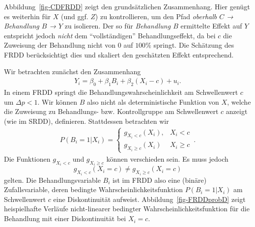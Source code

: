 \documentclass[
  a4paper,
  DIV=11,
  oneside]{scrreprt}
\begin{document}
Abbildung~\ref{fig-CDFRDD} zeigt den grundsätzlichen Zusammenhang. Hier
genügt es weiterhin für \(X\) (und ggf. \(Z\)) zu kontrollieren, um den
Pfad \emph{oberhalb \(C\) → Behandlung \(B\) → \(Y\)} zu isolieren. Der
so für \emph{Behandlung \(B\)} ermittelte Effekt auf \(Y\) entspricht
jedoch \emph{nicht} dem ``vollständigen'' Behandlungseffekt, da bei
\(c\) die Zuweisung der Behandlung nicht von \(0\) auf \(100\%\)
springt. Die Schätzung des FRDD berücksichtigt dies und skaliert den
geschätzten Effekt entsprechend.

Wir betrachten zunächst den Zusammenhang \begin{align}
  Y_i = \beta_0 + \beta_1 B_i + \beta_2 (X_i - c) + u_i.\label{eq-simpleFRDD}
\end{align} In einem FRDD springt die Behandlungswahrscheinlichkeit am
Schwellenwert \(c\) um \(\Delta p<1\). Wir können \(B\) also nicht als
deterministische Funktion von \(X\), welche die Zuweisung zu
Behandlungs- bzw. Kontrollgruppe am Schwellenwert \(c\) anzeigt (wie im
SRDD), definieren. Stattdessen betrachten wir \begin{align}
  P(B_i=1\vert X_i) = 
  \begin{cases}
    g_{X_i<c}(X_i), & X_i < c \\ 
    g_{X_i\geq c}(X_i) & X_i \geq c
  \end{cases}\,. \label{eq-BFRDD}
\end{align} Die Funktionen \(g_{X_i<c}\) und \(g_{X_i\geq c}\) können
verschieden sein. Es muss jedoch
\[g_{X_i<c}(X_i = c) \neq g_{X_i\geq c}(X_i = c)\] gelten. Die
Behandlungsvariable \(B_i\) ist im FRDD also eine (binäre)
Zufallsvariable, deren bedingte Wahrscheinlichkeitsfunktion
\(P(B_i=1\vert X_i)\) am Schwellenwert \(c\) eine Diskontinuität
aufweist. Abbildung~\ref{fig-FRDDprobD} zeigt heispielhafte Verläufe
nicht-linearer bedingter Wahrscheinlichkeitsfunktion für die Behandlung
mit einer Diskontinuität bei \(X_i = c\).
\end{document}
